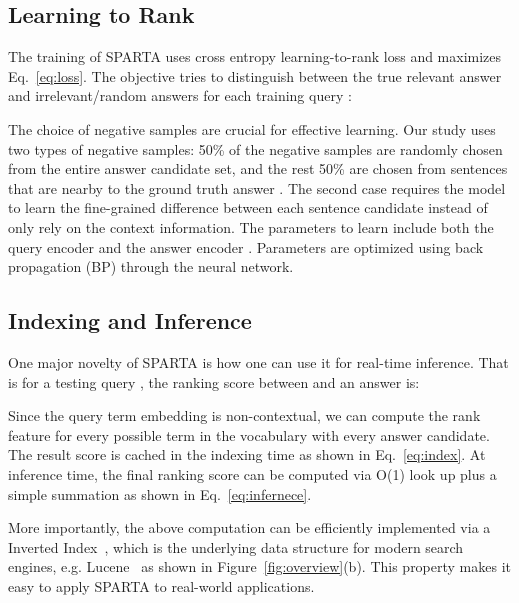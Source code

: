 \documentclass[11pt,a4paper]{article}
\begin{document}
\subsection{Learning to Rank}
The training of SPARTA uses cross entropy learning-to-rank loss and maximizes Eq.~\ref{eq:loss}. The objective tries to distinguish between the true relevant answer and irrelevant/random answers  for each training query :

The choice of negative samples  are crucial for effective learning. Our study uses two types of negative samples: 50\% of the negative samples are randomly chosen from the entire answer candidate set, and the rest 50\% are chosen from sentences that are nearby to the ground truth answer . The second case requires the model to learn the fine-grained difference between each sentence candidate instead of only rely on the context information. The parameters to learn include both the query encoder  and the answer encoder . Parameters are optimized using back propagation (BP) through the neural network. 

\subsection{Indexing and Inference}
\label{sec:infer}
One major novelty of SPARTA is how one can use it for real-time inference. That is for a testing query , the ranking score between  and an answer is:

Since the query term embedding is non-contextual, we can compute the rank feature  for every possible term  in the vocabulary  with every answer candidate. The result score is cached in the indexing time as shown in Eq.~\ref{eq:index}. At inference time, the final ranking score can be computed via O(1) look up plus a simple summation as shown in Eq.~\ref{eq:infernece}.

More importantly, the above computation can be efficiently implemented via a Inverted Index~\cite{manning2008introduction}, which is the underlying data structure for modern search engines, e.g. Lucene~\cite{mccandless2010lucene} as shown in Figure~\ref{fig:overview}(b). This property makes it easy to apply SPARTA to real-world applications.
\end{document}
